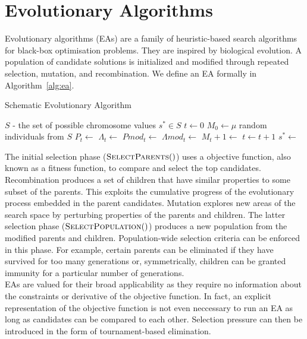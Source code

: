 \section{Evolutionary Algorithms}

Evolutionary algorithms (EAs) are a family of heuristic-based search algorithms for black-box optimisation problems. They are inspired by biological evolution. A population of candidate solutions is initialized and modified through repeated selection, mutation, and recombination. We define an EA formally in Algorithm~\ref{alg:ea}.\\

\begin{algorithm}
  \caption{Schematic Evolutionary Algorithm}\label{alg:ea}
  \begin{algorithmic}
  \Require $S$ - the set of possible chromosome values
  \Ensure $s^* \in S$
  \State $t \gets 0$
  \State $M_0 \gets \mu$ random individuals from $S$
    \State {}
    \State $P_t \gets$     
    \State $\Lambda_t \gets$   
    \State $Pmod_t \gets$ 
    \State $\Lambda mod_t \gets$ 
    \State $M_t+1 \gets$ 
    \State $t \gets t+1$
  \EndWhile
  \State $s^* \gets$ 
  \end{algorithmic}
\end{algorithm}

The initial selection phase ($\Call{SelectParents}$) uses a objective function, also known as a fitness function, to compare and select the top candidates. Recombination produces a set of children that have similar properties to some subset of the parents. This exploits the cumulative progress of the evolutionary process embedded in the parent candidates. Mutation explores new areas of the search space by perturbing properties of the parents and children. The latter selection phase ($\Call{SelectPopulation}$) produces a new population from the modified parents and children. Population-wide selection criteria can be enforced in this phase. For example, certain parents can be eliminated if they have survived for too many generations or, symmetrically, children can be granted immunity for a particular number of generations.\\

EAs are valued for their broad applicability as they require no information about the constraints or derivative of the objective function. In fact, an explicit representation of the objective function is not even neccessary to run an EA as long as candidates can be compared to each other. Selection pressure can then be introduced in the form of tournament-based elimination.\\

